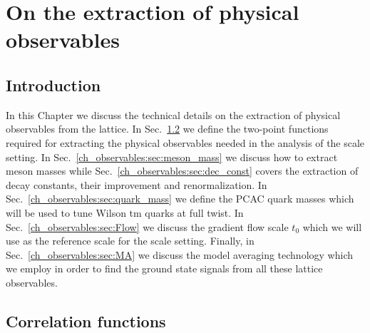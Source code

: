 \chapter{On the extraction of physical observables}%


\label{ch_observables}


\section{Introduction}
\label{ch_observables:sec:general}

In this Chapter we discuss the technical details on the extraction of physical observables from the lattice. In Sec.~\ref{ch_observables:sec:correlators} we define the two-point functions required for extracting the physical observables needed in the analysis of the scale setting. In Sec.~\ref{ch_observables:sec:meson_mass} we discuss how to extract meson masses while Sec.~\ref{ch_observables:sec:dec_const} covers the extraction of decay constants, their improvement and renormalization. In  Sec.~\ref{ch_observables:sec:quark_mass} we define the PCAC quark masses which will be used to tune Wilson tm quarks at full twist. In Sec.~\ref{ch_observables:sec:Flow} we discuss the gradient flow scale $t_0$ which we will use as the reference scale for the scale setting. Finally, in Sec.~\ref{ch_observables:sec:MA} we discuss the model averaging technology which we employ in order to find the ground state signals from all these lattice observables.


\section{Correlation functions}
\label{ch_observables:sec:correlators}

